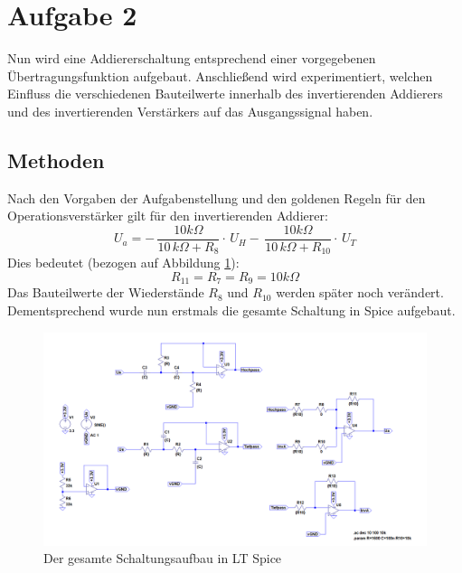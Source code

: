 \section{Aufgabe 2}
Nun wird eine Addiererschaltung entsprechend einer vorgegebenen Übertragungsfunktion aufgebaut. Anschließend wird experimentiert, welchen Einfluss die verschiedenen Bauteilwerte innerhalb des invertierenden Addierers und des invertierenden Verstärkers auf das Ausgangssignal haben.

\subsection{Methoden}


Nach den Vorgaben der Aufgabenstellung und den goldenen Regeln für den Operationsverstärker \cite{skript} gilt für den invertierenden Addierer:
\begin{equation}
U_{a}=-\,{\frac {10k\Omega }{10\,k\Omega +R_{8}}}\cdot\,U_{H}-\,{\frac {10k
\Omega}{10\,k\Omega +R_{10}}}\cdot\,U_{T}
\end{equation}
Dies bedeutet (bezogen auf Abbildung \ref{spicegesamt}):
\begin{equation}
R_{11}=R_{7}=R_{9}=10\si{k\Omega}
\end{equation}
Das Bauteilwerte der Wiederstände $R_{8}$ und  $R_{10}$ werden später noch verändert.
Dementsprechend wurde nun erstmals die gesamte Schaltung in Spice aufgebaut.\newline

\begin{figure}[h]
\includegraphics[width=14cm]{pics/SpiceSchaltungGesamt.png}
\caption{Der gesamte Schaltungsaufbau in LT Spice}
\label{spicegesamt}
\end{figure}

